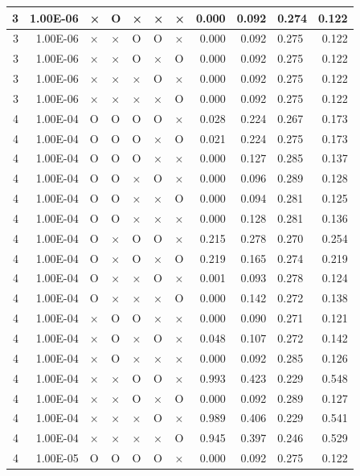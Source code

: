 \documentclass[11pt]{article}
\begin{document}
\begin{longtable}[h]{|r|r|l|l|l|l|l|r|r|l|r|}
3 & 1.00E-06 & × & O & × & × & × & 0.000 & 0.092 & 0.274 & 0.122 \\ \hline
3 & 1.00E-06 & × & × & O & O & × & 0.000 & 0.092 & 0.275 & 0.122 \\ \hline
3 & 1.00E-06 & × & × & O & × & O & 0.000 & 0.092 & 0.275 & 0.122 \\ \hline
3 & 1.00E-06 & × & × & × & O & × & 0.000 & 0.092 & 0.275 & 0.122 \\ \hline
3 & 1.00E-06 & × & × & × & × & O & 0.000 & 0.092 & 0.275 & 0.122 \\ \hline
4 & 1.00E-04 & O & O & O & O & × & 0.028 & 0.224 & 0.267 & 0.173 \\ \hline
4 & 1.00E-04 & O & O & O & × & O & 0.021 & 0.224 & 0.275 & 0.173 \\ \hline
4 & 1.00E-04 & O & O & O & × & × & 0.000 & 0.127 & 0.285 & 0.137 \\ \hline
4 & 1.00E-04 & O & O & × & O & × & 0.000 & 0.096 & 0.289 & 0.128 \\ \hline
4 & 1.00E-04 & O & O & × & × & O & 0.000 & 0.094 & 0.281 & 0.125 \\ \hline
4 & 1.00E-04 & O & O & × & × & × & 0.000 & 0.128 & 0.281 & 0.136 \\ \hline
4 & 1.00E-04 & O & × & O & O & × & 0.215 & 0.278 & 0.270 & 0.254 \\ \hline
4 & 1.00E-04 & O & × & O & × & O & 0.219 & 0.165 & 0.274 & 0.219 \\ \hline
4 & 1.00E-04 & O & × & × & O & × & 0.001 & 0.093 & 0.278 & 0.124 \\ \hline
4 & 1.00E-04 & O & × & × & × & O & 0.000 & 0.142 & 0.272 & 0.138 \\ \hline
4 & 1.00E-04 & × & O & O & × & × & 0.000 & 0.090 & 0.271 & 0.121 \\ \hline
4 & 1.00E-04 & × & O & × & O & × & 0.048 & 0.107 & 0.272 & 0.142 \\ \hline
4 & 1.00E-04 & × & O & × & × & × & 0.000 & 0.092 & 0.285 & 0.126 \\ \hline
4 & 1.00E-04 & × & × & O & O & × & 0.993 & 0.423 & 0.229 & 0.548 \\ \hline
4 & 1.00E-04 & × & × & O & × & O & 0.000 & 0.092 & 0.289 & 0.127 \\ \hline
4 & 1.00E-04 & × & × & × & O & × & 0.989 & 0.406 & 0.229 & 0.541 \\ \hline
4 & 1.00E-04 & × & × & × & × & O & 0.945 & 0.397 & 0.246 & 0.529 \\ \hline
4 & 1.00E-05 & O & O & O & O & × & 0.000 & 0.092 & 0.275 & 0.122 \\ \hline

\end{longtable}
\end{document}
